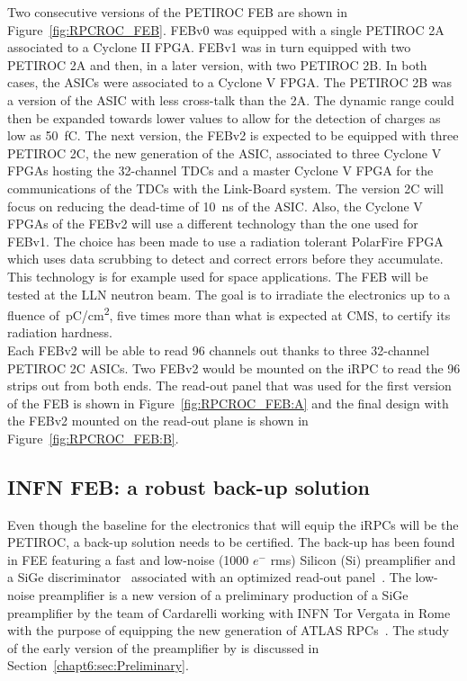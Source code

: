 	Two consecutive versions of the PETIROC FEB are shown in Figure~\ref{fig:RPCROC_FEB}. FEBv0 was equipped with a single PETIROC 2A associated to a Cyclone II FPGA. FEBv1 was in turn equipped with two PETIROC 2A and then, in a later version, with two PETIROC 2B. In both cases, the ASICs were associated to a Cyclone V FPGA. The PETIROC 2B was a version of the ASIC with less cross-talk than the 2A. The dynamic range could then be expanded towards lower values to allow for the detection of charges as low as \SI{50}{fC}. The next version, the FEBv2 is expected to be equipped with three PETIROC 2C, the new generation of the ASIC, associated to three Cyclone V FPGAs hosting the 32-channel TDCs and a master Cyclone V FPGA for the communications of the TDCs with the Link-Board system. The version 2C will focus on reducing the dead-time of \SI{10}{ns} of the ASIC. Also, the Cyclone V FPGAs of the FEBv2 will use a different technology than the one used for FEBv1. The choice has been made to use a radiation tolerant PolarFire FPGA which uses data scrubbing to detect and correct errors before they accumulate. This technology is for example used for space applications. The FEB will be tested at the \acf{LLN} neutron beam. The goal is to irradiate the electronics up to a fluence of \,\si{pC/cm^2}, five times more than what is expected at CMS, to certify its radiation hardness.\\
	Each FEBv2 will be able to read 96 channels out thanks to three 32-channel PETIROC 2C ASICs. Two FEBv2 would be mounted on the iRPC to read the 96 strips out from both ends. The read-out panel that was used for the first version of the FEB is shown in Figure~\ref{fig:RPCROC_FEB:A} and the final design with the FEBv2 mounted on the read-out plane is shown in Figure~\ref{fig:RPCROC_FEB:B}.

	\subsection{INFN FEB: a robust back-up solution}
	\label{chapt6:ssec:INFN}
	
	Even though the baseline for the electronics that will equip the iRPCs will be the PETIROC, a back-up solution needs to be certified. The back-up has been found in \acl{FEE} featuring a fast and low-noise (1000 $e^-$ rms) Silicon (Si) preamplifier and a SiGe discriminator~\cite{PIZZIMENTO2018} associated with an optimized read-out panel~\cite{ALUNNOCAMELIA2018}. The low-noise preamplifier is a new version of a preliminary production of a SiGe preamplifier by the team of Cardarelli working with INFN Tor Vergata in Rome with the purpose of equipping the new generation of ATLAS RPCs~\cite{CARDARELLI2013}. The study of the early version of the preamplifier by is discussed in Section~\ref{chapt6:sec:Preliminary}.
	 
